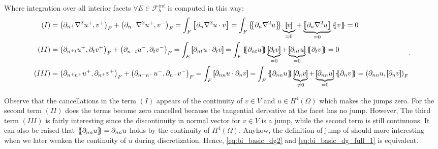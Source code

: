 Where integration over all interior facets $ \forall E \in \mathcal{F}_{h}^{int}$ is computed in this way:
\begin{equation*}
    \begin{split}
        (I) &  =    \left(\partial _{n^{+}} \nabla ^2 u^{+} ,v^{+}\right)_{F} +
        \left(\partial _{n^{-}} \nabla ^2 u^{+} ,v^{-}\right)_{F} =   \int_{F}^{}
        \jump{ \partial _{n} \nabla ^2 u \cdot v } =
         \int_{F}^{}
         \mean{ \partial _{n} \nabla ^2 u } \underbrace{\jump{ v }}_{= 0}    + \underbrace{\jump{ \partial _{n} \nabla ^2 u
         }}_{= 0}    \mean{ v } = 0 \\
        (II) &  =     \left(\partial _{n^{+}t} u^{+}, \partial_{t} v^{+}
        \right)_{F} +  \left(\partial _{n^{-}t} u^{-}, \partial_{t} v^{-}
\right)_{F}    =   \int_{E}^{}
        \jump{ \partial _{nt} u \cdot  \partial_{t} v } =
         \int_{F}^{}
         \mean{ \partial _{nt} u    } \underbrace{\jump{ \partial_{t} v }  }_{= 0}    + \underbrace{\jump{ \partial
                 _{nt}  u
         }}_{= 0}    \mean{ \partial _{t}v }  = 0\\
        (III) &  =     \left(\partial _{n^{+}n^{+}} u^{+}, \partial_{n^{+}} v^{+} \right)_{F} +  \left(\partial _{n^{-}n^{-}} u^{-}, \partial_{n^{-}} v^{-} \right)_{F}    =    \int_{F}^{} \jump{ \partial _{nn} u \cdot  \partial_{n} v } = \int_{F}^{}
        \mean{ \partial _{nn} u    } \underbrace{\jump{ \partial_{n} v }  }_{\neq 0}    + \underbrace{\jump{ \partial
                 _{nn}  u
         }}_{= 0}    \mean{ \partial _{n}v } =
        \left( \partial _{nn} u    , \jump{ \partial_{n} v } \right)_{F}  \\
    \end{split}
.\end{equation*}

Observe that the cancellations in the term $(I)$ appears of the continuity of $v\in V $ and $u\in H^{4}\left( \Omega  \right) $ which makes the jumps zero. For the second term $(II)$ does the terms become zero cancelled because the tangential
derivative at the facet has no jump. However, The third term $(III)$  is fairly interesting since the discontinuity in normal vector for $v \in V$ is a jump, while the second term is still continuous. It can also be raised that $\left\{\!\!\left\{ \partial _{nn} u \right\}\!\!\right\} = \partial _{nn} u  $ holds by the continuity of $H^{4}\left( \Omega  \right) $. Anyhow, the definition of jump of should more interesting when we later weaken the continuity of $u$ during discretization.
Hence, \eqref{eq:bi_basic_dg2} and \eqref{eq:bi_basic_dg_full_1} is equivalent.

